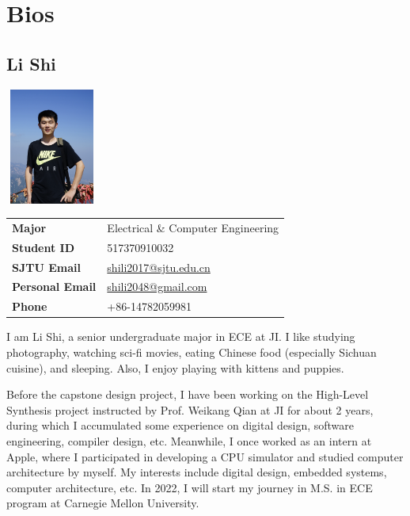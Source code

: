 
\chapter{Bios}

\section{Li Shi}

\begin{minipage}{0.25\textwidth}
  \includegraphics[width=1.2in,height=1.5in,clip,keepaspectratio]{figure/sl.png}
\end{minipage}
\begin{minipage}{0.75\textwidth}\raggedright
  \begin{tabular}{l l}
    \textbf{Major}          & Electrical \& Computer Engineering \\
    \textbf{Student ID}     & 517370910032 \\
    \textbf{SJTU Email}     & \url{shili2017@sjtu.edu.cn} \\
    \textbf{Personal Email} & \url{shili2048@gmail.com} \\
    \textbf{Phone}          & +86-14782059981
  \end{tabular}
\end{minipage}

I am Li Shi, a senior undergraduate major in ECE at JI. I like studying photography, watching sci-fi movies, eating Chinese food (especially Sichuan cuisine), and sleeping. Also, I enjoy playing with kittens and puppies.

Before the capstone design project, I have been working on the High-Level Synthesis project instructed by Prof. Weikang Qian at JI for about 2 years, during which I accumulated some experience on digital design, software engineering, compiler design, etc. Meanwhile, I once worked as an intern at Apple, where I participated in developing a CPU simulator and studied computer architecture by myself. My interests include digital design, embedded systems, computer architecture, etc. In 2022, I will start my journey in M.S. in ECE program at Carnegie Mellon University.


